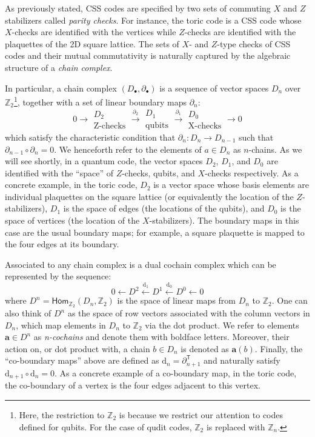 \documentclass[aps,prx,reprint,superscriptaddress,nofootinbib]{revtex4-2}
\theoremstyle{definition}
\newcommand{\exd}{\text{d}}
\newcommand{\<}{\langle}
\renewcommand{\>}{\rangle}
\begin{document}
As previously stated, CSS codes are specified by two sets of commuting $X$ and $Z$ stabilizers called \textit{parity checks}.
%
For instance, the toric code is a CSS code whose $X$-checks are identified with the vertices while $Z$-checks are identified with the plaquettes of the 2D square lattice.
%
%
The sets of $X$- and $Z$-type checks of CSS codes and their mutual commutativity is naturally captured by the algebraic structure of a \textit{chain complex}.

In particular, a chain complex $(D_\bullet,\partial_\bullet)$ is a sequence of vector spaces $D_n$ over $\mathbb{Z}_2$\footnote{Here, the restriction to $\mathbb{Z}_2$ is because we restrict our attention to codes defined for qubits.
%
For the case of qudit codes, $\mathbb{Z}_2$ is replaced with $\mathbb{Z}_n$.},
%
together with a set of linear boundary maps $\partial_n$:
 \begin{equation}
    0\longrightarrow \substack{\displaystyle D_2\\ \text{Z-checks}}\xrightarrow{\partial_2}\substack{\displaystyle D_1\\ \text{qubits}}\xrightarrow{\partial_1}\substack{\displaystyle D_0\\ \text{X-checks}}\rightarrow0
\end{equation}
which satisfy the characteristic condition that $\partial_n:D_n\rightarrow D_{n-1}$ such that $\partial_{n-1}\circ \partial_{n}=0$.
%
We henceforth refer to the elements of $a \in D_n$ as $n$-chains.
%
As we will see shortly, in a quantum code, the vector spaces $D_2$,  $D_1$, and $D_0$ are identified with the ``space'' of $Z$-checks, qubits, and $X$-checks respectively.
%
As a concrete example, in the toric code, $D_2$ is a vector space whose basis elements are individual plaquettes on the square lattice (or equivalently the location of the $Z$-stabilizers), $D_1$ is the space of edges (the locations of the qubits), and $D_0$ is the space of vertices (the location of the $X$-stabilizers).
%
The boundary maps in this case are the usual boundary maps; for example, a square plaquette is mapped to the four edges at its boundary.

Associated to any chain complex is a dual cochain complex which can be represented by the sequence:
\begin{equation} \label{eq-cochaincomplex}
    0\leftarrow D^2\xleftarrow{\exd_{1}}D^1\xleftarrow{\exd_{0}}D^0\leftarrow0
\end{equation}
where $D^n=\mathsf{Hom}_{\mathbb{Z}_2}(D_n,\mathbb{Z}_2)$ is the space of linear maps from $D_n$ to $\mathbb{Z}_2$. 
%
One can also think of $D^n$ as the space of row vectors associated with the column vectors in $D_n$, which map elements in $D_n$ to $\mathbb{Z}_2$ via the dot product.
%
We refer to elements $\mathbf{a} \in D^n$ as \textit{n-cochains} and denote them with boldface letters.
%
Moreover, their action on, or dot product with, a chain $b \in D_n$ is denoted as $\mathbf{a}(b)$.
%
Finally, the ``co-boundary maps'' above are defined as $\exd_n = \partial_{n + 1}^{\mathsf{T}}$ and naturally satisfy $\exd_{n + 1} \circ \exd_n = 0$.
%
As a concrete example of a co-boundary map, in the toric code, the co-boundary of a vertex is the four edges adjacent to this vertex.
\end{document}
